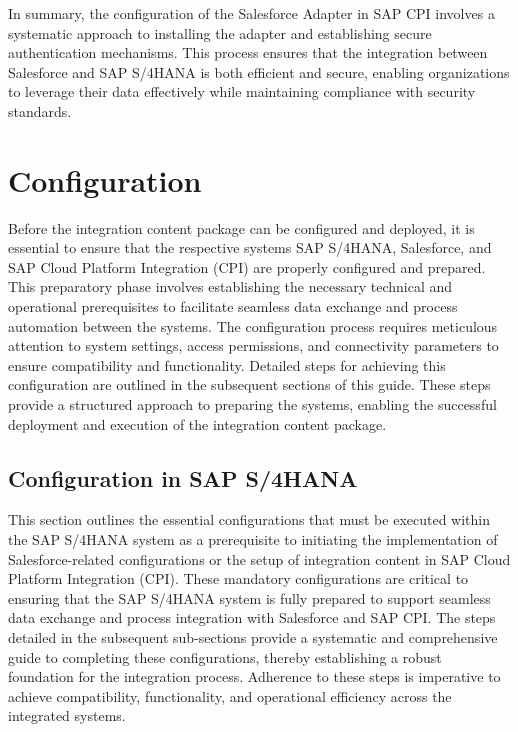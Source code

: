 In summary, the configuration of the Salesforce Adapter in SAP CPI involves a systematic approach to installing the adapter and establishing secure authentication mechanisms. This process ensures that the integration between Salesforce and SAP S/4HANA is both efficient and secure, enabling organizations to leverage their data effectively while maintaining compliance with security standards.


\section{Configuration}

Before the integration content package can be configured and deployed, it is essential to ensure that the respective systems SAP S/4HANA, Salesforce, and SAP Cloud Platform Integration (CPI) are properly configured and prepared. This preparatory phase involves establishing the necessary technical and operational prerequisites to facilitate seamless data exchange and process automation between the systems. The configuration process requires meticulous attention to system settings, access permissions, and connectivity parameters to ensure compatibility and functionality. Detailed steps for achieving this configuration are outlined in the subsequent sections of this guide. These steps provide a structured approach to preparing the systems, enabling the successful deployment and execution of the integration content package.

\subsection{Configuration in SAP S/4HANA }

This section outlines the essential configurations that must be executed within the SAP S/4HANA system as a prerequisite to initiating the implementation of Salesforce-related configurations or the setup of integration content in SAP Cloud Platform Integration (CPI). These mandatory configurations are critical to ensuring that the SAP S/4HANA system is fully prepared to support seamless data exchange and process integration with Salesforce and SAP CPI. The steps detailed in the subsequent sub-sections provide a systematic and comprehensive guide to completing these configurations, thereby establishing a robust foundation for the integration process. Adherence to these steps is imperative to achieve compatibility, functionality, and operational efficiency across the integrated systems.

